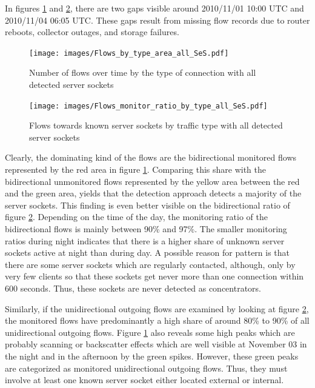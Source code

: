 In figures \ref{fig:flows_by_type} and \ref{fig:monitored_flows_by_type}, there 
are two gaps visible around 2010/11/01 10:00 UTC and 2010/11/04 06:05 UTC. These 
gaps result from missing flow records due to router reboots, collector outages, 
and storage failures\citep{Schatzmann:Mining}.

\begin{figure}
	[ht] \centering 
	\texttt{[image: images/Flows\_by\_type\_area\_all\_SeS.pdf]}
	\caption{Number of flows over time by the type of connection with all detected server sockets} 
	\label{fig:flows_by_type} 
\end{figure}

\begin{figure}[h]
	\centering 
	\texttt{[image: images/Flows\_monitor\_ratio\_by\_type\_all\_SeS.pdf]}
	\caption{Flows towards known server sockets by traffic type with all detected server sockets} 
	\label{fig:monitored_flows_by_type} 
\end{figure}

Clearly, the dominating kind of the flows are the bidirectional monitored flows 
represented by the red area in figure \ref{fig:flows_by_type}. Comparing this 
share with the bidirectional unmonitored flows represented by the yellow area 
between the red and the green area, yields that the detection approach detects a 
majority of the \glspl{server socket}. This finding is even better visible on 
the bidirectional ratio of figure \ref{fig:monitored_flows_by_type}. Depending 
on the time of the day, the monitoring ratio of the bidirectional flows is 
mainly between 90\% and 97\%. 
The smaller monitoring ratios during night indicates that there is a higher 
share of unknown \glspl{server socket} active at night than during day.
A possible reason for pattern is that there are some 
\glspl{server socket} which are regularly contacted, although, only by very few 
clients so that these sockets get never more than one connection within 600 
seconds. Thus, these sockets are never detected as concentrators. 

Similarly, if the unidirectional outgoing flows are examined by looking at 
figure \ref{fig:monitored_flows_by_type}, the monitored flows have predominantly 
a high share of around 80\% to 90\% of all unidirectional outgoing flows. Figure 
\ref{fig:flows_by_type} also reveals some high peaks which are probably scanning 
or backscatter effects which are well visible at November 03 in the night and in 
the afternoon by the green spikes. However, these green peaks are categorized as 
monitored unidirectional outgoing flows. Thus, they must involve at least one 
known \gls{server socket} either located external or internal.

